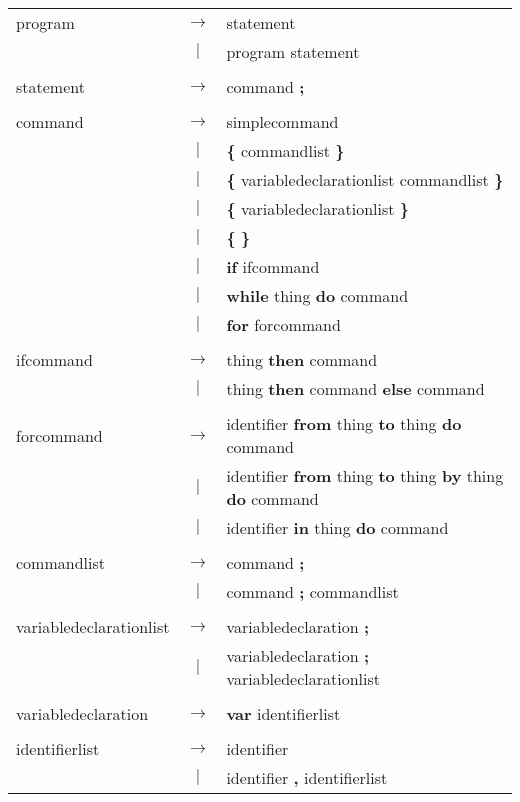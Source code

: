 \begin{tabular}{lcl}
program & $\rightarrow$ & statement \\
 & $|$ & program statement \\
 & & \\
statement & $\rightarrow$ & command \textbf{;} \\
 & & \\
command & $\rightarrow$ & simplecommand \\
 & $|$ & \textbf{\{} commandlist \textbf{\}} \\
 & $|$ & \textbf{\{} variabledeclarationlist commandlist \textbf{\}} \\
 & $|$ & \textbf{\{} variabledeclarationlist \textbf{\}} \\
 & $|$ & \textbf{\{} \textbf{\}} \\
 & $|$ & \textbf{if} ifcommand \\
 & $|$ & \textbf{while} thing \textbf{do} command \\
 & $|$ & \textbf{for} forcommand \\
 & & \\
ifcommand & $\rightarrow$ & thing \textbf{then} command \\
 & $|$ & thing \textbf{then} command \textbf{else} command \\
 & & \\
forcommand & $\rightarrow$ & identifier \textbf{from} thing \textbf{to} thing \textbf{do} command \\
 & $|$ & identifier \textbf{from} thing \textbf{to} thing \textbf{by} thing \textbf{do} command \\
 & $|$ & identifier \textbf{in} thing \textbf{do} command \\
 & & \\
commandlist & $\rightarrow$ & command \textbf{;} \\
 & $|$ & command \textbf{;} commandlist \\
 & & \\
variabledeclarationlist & $\rightarrow$ & variabledeclaration \textbf{;} \\
 & $|$ & variabledeclaration \textbf{;} variabledeclarationlist \\
 & & \\
variabledeclaration & $\rightarrow$ & \textbf{var} identifierlist \\
 & & \\
identifierlist & $\rightarrow$ & identifier \\
 & $|$ & identifier \textbf{,} identifierlist \\

\end{tabular}
